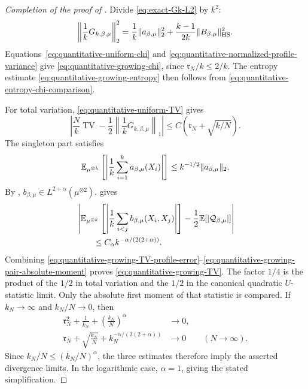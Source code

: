 \documentclass[11pt,reqno]{amsart}
\numberwithin{equation}{section}
\theoremstyle{plain}
\theoremstyle{remark}
\DeclarePairedDelimiter{\norm}{\lVert}{\rVert}
\newcommand{\E}{{\mathbb{E}}}
\newcommand{\be}{\beta}
\newcommand{\TV}{\operatorname{TV}}
\begin{document}
\begin{proof}[Completion of the proof of ]

Divide \eqref{eq:exact-Gk-L2} by $k^2$:
\begin{equation}\label{eq:quantitative-normalized-profile-variance}
 \left\|\frac1kG_{k,\be,\mu}\right\|_2^2
 =\frac1k\norm{a_{\be,\mu}}_2^2
 +\frac{k-1}{2k}\norm{B_{\be,\mu}}_{\mathrm{HS}}^2.
\end{equation}
Equations~\eqref{eq:quantitative-uniform-chi} and \eqref{eq:quantitative-normalized-profile-variance} give \eqref{eq:quantitative-growing-chi}, since $\mathfrak r_N/k\leq2/k$.
  The entropy estimate \eqref{eq:quantitative-growing-entropy} then follows from \eqref{eq:quantitative-entropy-chi-comparison}.

For total variation, \eqref{eq:quantitative-uniform-TV} gives
\begin{equation}\label{eq:quantitative-growing-TV-profile-error}
 \left|\frac Nk\TV-\frac12\left\|\frac1kG_{k,\be,\mu}\right\|_1\right|
 \leq C\left(\mathfrak r_N+\sqrt{k/N}\right).
\end{equation}
The singleton part satisfies
\begin{equation}\label{eq:quantitative-growing-singleton-L1}
 \E_{\mu^{\otimes k}}\left[\left|\frac1k\sum_{i=1}^ka_{\be,\mu}(X_i)\right|\right]
 \leq k^{-1/2}\norm{a_{\be,\mu}}_2.
\end{equation}
By , $b_{\be,\mu}\in L^{2+\alpha}(\mu^{\otimes2})$.   gives
\begin{align}
 &\left|\E_{\mu^{\otimes k}}\left[\left|\frac1k\sum_{i<j}b_{\be,\mu}(X_i,X_j)\right|\right]
 -\frac12\E[|\mathcal Q_{\be,\mu}|]\right|\notag\\
 &\qquad\leq C_\alpha k^{-\alpha/(2(2+\alpha))}.
 \label{eq:quantitative-growing-pair-absolute-moment}
\end{align}
Combining \eqref{eq:quantitative-growing-TV-profile-error}--\eqref{eq:quantitative-growing-pair-absolute-moment} proves \eqref{eq:quantitative-growing-TV}.  The factor $1/4$ is the product of the $1/2$ in total variation and the $1/2$ in the canonical quadratic $U$-statistic limit.  Only the absolute first moment of that statistic is compared.  If $k_N\to\infty$ and $k_N/N\to0$, then
\begin{align}
 \mathfrak r_N^2+\frac1{k_N}+\left(\frac{k_N}{N}\right)^\alpha
 &\longrightarrow0,\label{eq:profile-pass-growing-information-errors}\\
 \mathfrak r_N+\sqrt{\frac{k_N}{N}}+k_N^{-\alpha/(2(2+\alpha))}
 &\longrightarrow0\qquad(N\to\infty).
 \label{eq:profile-pass-growing-TV-errors}
\end{align}
Since $k_N/N\leq(k_N/N)^\alpha$, the three estimates therefore imply the asserted divergence limits.  In the logarithmic case, $\alpha=1$, giving the stated simplification.
\end{proof}
\end{document}
